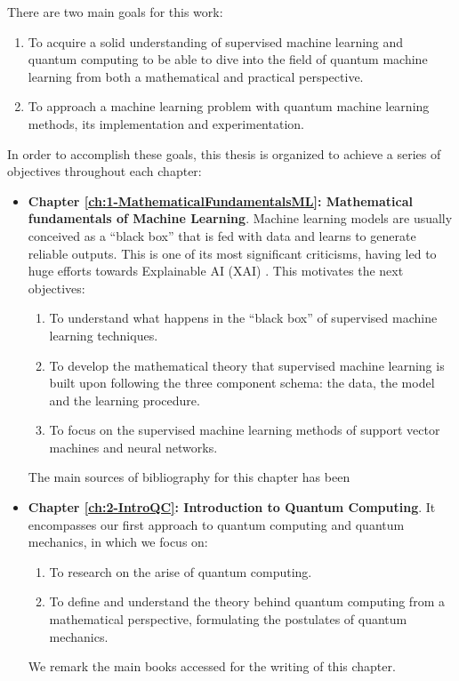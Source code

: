 There are two main goals for this work:
\begin{enumerate}
	\item To acquire a solid understanding of supervised machine learning and quantum computing to be able to dive into the field of quantum machine learning from both a mathematical and practical perspective.
	\item To approach a machine learning problem with quantum machine learning methods, its implementation and experimentation.
\end{enumerate}

In order to accomplish these goals, this thesis is organized to achieve a series of objectives throughout each chapter:

\begin{itemize}
    \item \textbf{Chapter \ref{ch:1-MathematicalFundamentalsML}: Mathematical fundamentals of Machine Learning}. Machine learning models are usually conceived as a ``black box''  that is fed with data and learns to generate reliable outputs. This is one of its most significant criticisms, having led to huge efforts towards Explainable AI (XAI) \cite{ali2023explainable}. This motivates the next objectives:
    
    \begin{enumerate}
        \item To understand what happens in the ``black box'' of supervised machine learning techniques.
        \item To develop the mathematical theory that supervised machine learning is built upon following the three component schema: the data, the model and the learning procedure.
        \item To focus on the supervised machine learning methods of support vector machines and neural networks.
    \end{enumerate}
    The main sources of bibliography for this chapter has been \cite{mustafa-learningdata, jung2022machine, nielsen2015neural, schuld2021machine}

    \item \textbf{Chapter \ref{ch:2-IntroQC}: Introduction to Quantum Computing}. It encompasses our first approach to quantum computing and quantum mechanics, in which we focus on:

    \begin{enumerate}[resume]
        \item To research on the arise of quantum computing.
        \item To define and understand the theory behind quantum computing from a mathematical perspective, formulating the postulates of quantum mechanics.  
    \end{enumerate}
    We remark the main books \cite{nielsen_chuang_2010, Scherer_book} accessed for the writing of this chapter.


\end{itemize}
